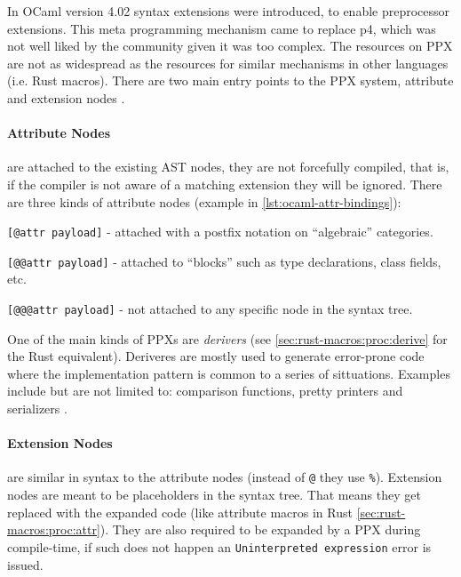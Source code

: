 In OCaml version 4.02 syntax extensions were introduced, to enable preprocessor extensions.
This meta programming mechanism came to replace \gls{p4}, which was not well liked by the community given it was too complex.
The resources on \gls{PPX} are not as widespread as the resources for similar mechanisms in other languages (i.e. Rust macros).
There are two main entry points to the PPX system, attribute and extension nodes \autocite[Sections 8.12 \& 8.13]{Leroy2020}.

\paragraph{Attribute Nodes} are attached to the existing AST nodes,
they are not forcefully compiled, that is, if the compiler is not aware of a matching extension they will be ignored.
There are three kinds of attribute nodes (example in \autoref{lst:ocaml-attr-bindings}):
\begin{displayquote}
	\begin{compactitem}
		\item \texttt{[@attr payload]} - attached with a postfix notation on “algebraic” categories.
		\item \texttt{[@@attr payload]} - attached to “blocks” such as type declarations, class fields, etc.
		\item \texttt{[@@@attr payload]} - not attached to any specific node in the syntax tree.
	\end{compactitem}
\end{displayquote}

One of the main kinds of PPXs are \emph{derivers} (see \autoref{sec:rust-macros:proc:derive} for the Rust equivalent).
Deriveres are mostly used to generate error-prone code where the implementation pattern is common to a series of sittuations.
Examples include but are not limited to: comparison functions, pretty printers and serializers \autocite{Rebours2019}.



\paragraph{Extension Nodes} are similar in syntax to the attribute nodes (instead of \texttt{@} they use \texttt{\%}).
Extension nodes are meant to be placeholders in the syntax tree.
That means they get replaced with the expanded code (like attribute macros in Rust \autoref{sec:rust-macros:proc:attr}).
They are also required to be expanded by a PPX during compile-time,
if such does not happen an \texttt{Uninterpreted expression} error is issued.

